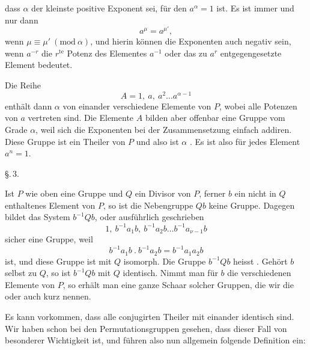 
dass $\alpha$ der kleinste positive Exponent sei, für den $a^\alpha = 1$
ist. Es ist immer und nur dann
\[
a^\mu = a^{\mu'},
\]
wenn $\mu \equiv \mu'\ (\mathrm{mod}\ \alpha)$, und hierin können die
Exponenten auch negativ sein, wenn $a^{-r}$ die $r^{\mathrm{te}}$ Potenz
des Elementes $a^{-1}$ oder das zu $a^r$ entgegengesetzte Element
bedeutet.

Die Reihe
\[
A = 1,\ a,\ a^2 \ldots a^{\alpha-1}
\]
enthält dann $\alpha$ von einander verschiedene Elemente von $P$, wobei
alle Potenzen von $a$ vertreten sind. Die Elemente $A$ bilden aber
offenbar eine Gruppe vom Grade $\alpha$, weil sich die Exponenten bei der
Zusammensetzung einfach addiren. Diese Gruppe ist ein Theiler von $P$ und
also ist $\alpha$ . Es ist also für jedes Element
$a^n = 1$.


\begin{center}
\S.\,3.

\end{center}

Ist $P$ wie oben eine Gruppe und $Q$ ein Divisor von $P$, ferner $b$ ein
nicht in $Q$ enthaltenes Element von $P$, so ist die Nebengruppe $Qb$
keine Gruppe. Dagegen bildet das System $b^{-1}Qb$, oder ausführlich
geschrieben
\[
1,\ b^{-1}a_1 b,\ b^{-1}a_2 b \ldots b^{-1}a_{\nu-1} b
\]
sicher eine Gruppe, weil
\[
b^{-1}a_1 b\ .\ b^{-1}a_2 b = b^{-1}a_1 a_2 b
\]
ist, und diese Gruppe ist mit $Q$ isomorph. Die Gruppe $b^{-1}Qb$ heisst
. Gehört $b$ selbst zu $Q$, so ist
$b^{-1}Qb$ mit $Q$ identisch. Nimmt man für $b$ die verschiedenen Elemente
von $P$, so erhält man eine ganze Schaar solcher Gruppen, die wir die
 oder auch kurz  nennen.

Es kann vorkommen, dass alle conjugirten Theiler mit einander identisch
sind. Wir haben schon bei den Permutationsgruppen gesehen, dass dieser
Fall von besonderer Wichtigkeit ist, und führen also nun allgemein
folgende Definition ein:
